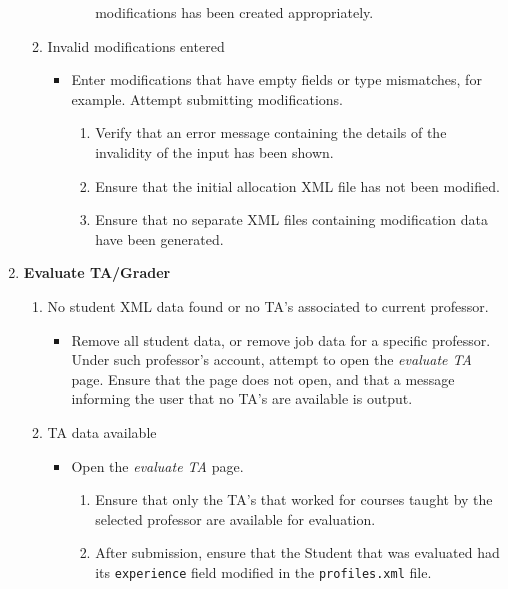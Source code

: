 \documentclass[12pt]{report}
\begin{document}
\begin{enumerate}
\begin{enumerate}
\begin{itemize}
\begin{enumerate}
								modifications has been created appropriately.
						\end{enumerate}
				\end{itemize}
			\item Invalid modifications entered
				\begin{itemize}
					\item Enter modifications that have empty fields or type mismatches, for
						example. Attempt submitting modifications.
						\begin{enumerate}
							\item Verify that an error message containing the details of the
								invalidity of the input has been shown.
							\item Ensure that the initial allocation XML file has not been modified.
							\item Ensure that no separate XML files containing modification data
								have been generated.
						\end{enumerate}
				\end{itemize}
		\end{enumerate}
	\item \textbf{Evaluate TA/Grader}
		\begin{enumerate}
			\item No student XML data found or no TA's associated to current professor.
				\begin{itemize}
					\item Remove all student data, or remove job data for a specific professor.
						Under such professor's account, attempt to open the \textit{evaluate TA}
						page. Ensure that the page does not open, and that a message informing the
						user that no TA's are available is output.
				\end{itemize}
			\item TA data available
				\begin{itemize}
					\item Open the \textit{evaluate TA} page.
						\begin{enumerate}
							\item Ensure that only the TA's that worked for courses taught by the
								selected professor are available for evaluation.
							\item After submission, ensure that the Student that was evaluated had
								its \texttt{experience} field modified in the \texttt{profiles.xml}
								file.
						\end{enumerate}
				\end{itemize}
		\end{enumerate}
\end{enumerate}
\end{document}
